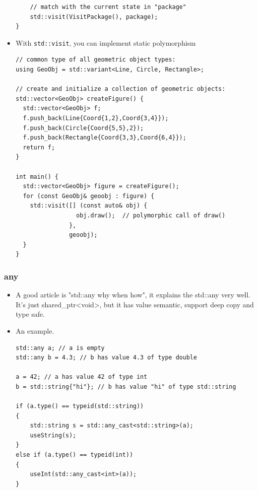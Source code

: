 \documentclass[a4paper,11pt,twoside]{book}
\begin{document}
\begin{itemize}
\begin{lstlisting}
    // match with the current state in "package"
    std::visit(VisitPackage(), package);
}
\end{lstlisting}

\item With \texttt{std::visit}, you can implement static polymorphism

\begin{lstlisting}
// common type of all geometric object types:
using GeoObj = std::variant<Line, Circle, Rectangle>;
  
// create and initialize a collection of geometric objects:
std::vector<GeoObj> createFigure() {
  std::vector<GeoObj> f;
  f.push_back(Line{Coord{1,2},Coord{3,4}});
  f.push_back(Circle{Coord{5,5},2});  
  f.push_back(Rectangle{Coord{3,3},Coord{6,4}});  
  return f;
}

int main() {
  std::vector<GeoObj> figure = createFigure();
  for (const GeoObj& geoobj : figure) {
    std::visit([] (const auto& obj) {
                 obj.draw();  // polymorphic call of draw()
               },
               geoobj);
  }
}
\end{lstlisting}

\end{itemize}

\subsubsection{any}
\begin{itemize}
		\item A good article is "std::any why when how", it explains the std::any very well. It's just shared\_ptr<void>, but it has value semantic, support deep copy and type safe. 
		\item An example.
\begin{lstlisting}
std::any a; // a is empty
std::any b = 4.3; // b has value 4.3 of type double
 
a = 42; // a has value 42 of type int
b = std::string{"hi"}; // b has value "hi" of type std::string
 
if (a.type() == typeid(std::string)) 
{
    std::string s = std::any_cast<std::string>(a);
    useString(s);
}
else if (a.type() == typeid(int)) 
{
    useInt(std::any_cast<int>(a));
}
\end{lstlisting}
\end{itemize}
\end{document}
